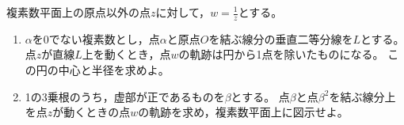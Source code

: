 \documentclass[../../main.tex]{subfiles}
\begin{document}
複素数平面上の原点以外の点$z$に対して，$\displaystyle w=\frac{1}{z}$とする。
\begin{enumerate}
  \item$\alpha$を0でない複素数とし，点$\alpha$と原点$O$を結ぶ線分の垂直二等分線を$L$とする。
    点$z$が直線$L$上を動くとき，点$w$の軌跡は円から1点を除いたものになる。
    この円の中心と半径を求めよ。
  \item1の3乗根のうち，虚部が正であるものを$\beta$とする。
    点$\beta$と点$\beta^2$を結ぶ線分上を点$z$が動くときの点$w$の軌跡を求め，複素数平面上に図示せよ。
\end{enumerate}
\end{document}
